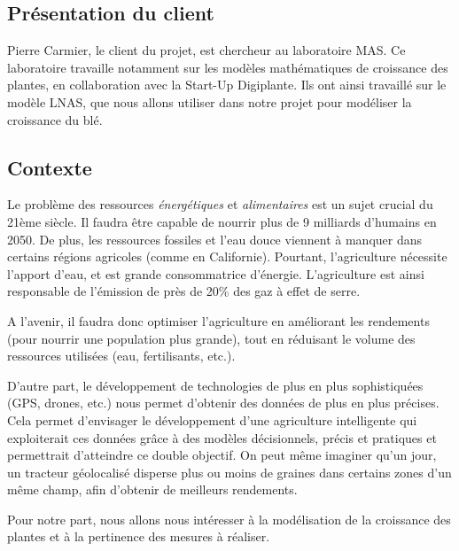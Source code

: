 \subsection{Présentation du client}
Pierre Carmier, le client du projet, est chercheur au laboratoire MAS. Ce laboratoire travaille notamment sur les modèles mathématiques de croissance des plantes, en collaboration avec la Start-Up Digiplante. Ils ont ainsi travaillé sur le modèle LNAS, que nous allons utiliser dans notre projet pour modéliser la croissance du blé.
\subsection{Contexte}
Le problème des ressources \textit{énergétiques} et \textit{alimentaires} est un sujet crucial du  21ème siècle.
Il faudra être capable de nourrir plus de 9 milliards d'humains en 2050. De plus, les ressources fossiles et l'eau douce viennent à manquer dans certains régions agricoles (comme en Californie). Pourtant, l'agriculture nécessite l'apport d'eau, et est grande consommatrice d'énergie. L'agriculture est ainsi responsable de l'émission de près de 20\% des gaz à effet de serre\cite{GES}.

A l'avenir, il faudra donc optimiser l'agriculture en améliorant les rendements (pour nourrir une population plus grande), tout en réduisant le volume des ressources utilisées (eau, fertilisants, etc.).

D'autre part, le développement de technologies de plus en plus sophistiquées (GPS, drones, etc.) nous permet d'obtenir des données de plus en plus précises.
Cela permet d'envisager le développement d'une agriculture intelligente qui exploiterait ces données grâce à des modèles décisionnels, précis et pratiques et permettrait d'atteindre ce double objectif. On peut même imaginer qu'un jour, un tracteur géolocalisé disperse plus ou moins de graines dans certains zones d'un même champ, afin d'obtenir de meilleurs rendements.

Pour notre part, nous allons nous intéresser à la modélisation de la croissance des plantes et à la pertinence des mesures à réaliser.
